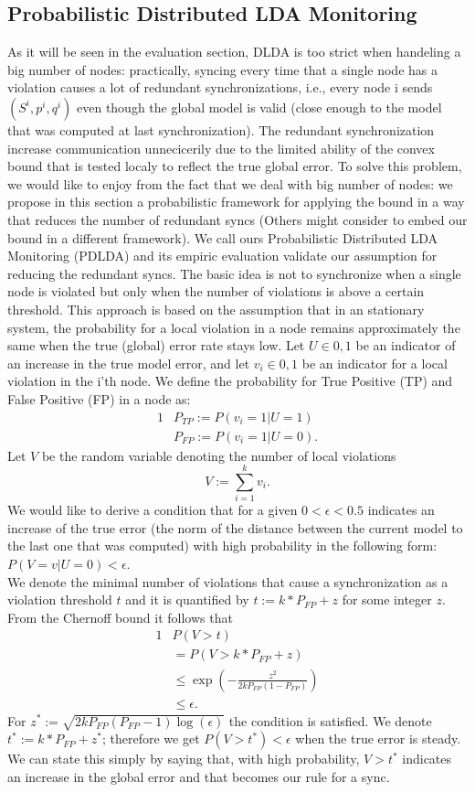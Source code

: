 \documentclass{sig-alternate-05-2015}
\begin{document}
\subsection{Probabilistic Distributed LDA Monitoring}
As it will be seen in the evaluation section, DLDA is too strict when handeling
a big number of nodes: practically, syncing every time that a single node
has a violation causes a lot of redundant synchronizations, i.e., every node i
sends $(S^i,p^i,q^i)$ even though the global model is valid (close enough
to the model that was computed at last synchronization). The redundant
synchronization increase communication unnecicerily due to the limited ability 
of the convex bound that is tested localy to reflect the true global error.
To solve this problem, we would like to enjoy from the fact that we deal with 
big number of nodes: we propose in this section a
probabilistic framework for applying the bound in a way that reduces the number of redundant syncs (Others might consider
to embed our bound in a different framework). 
We call ours Probabilistic Distributed LDA Monitoring (PDLDA) and its
empiric evaluation validate our assumption for reducing the redundant syncs.
The basic idea is not to synchronize when a single node is violated but only 
when the number of violations is above a certain threshold. 
This approach is based on the assumption that in an stationary system, 
the probability for a local violation in a node remains approximately the same
when the true (global) error rate stays low. 
Let $U \in {0,1}$ be an indicator of an increase in the true model error,
and let $v_i \in {0,1}$ be an indicator for a local violation in the
i'th node. We define the probability for True Positive (TP) and False Positive
(FP) in a node as:
\begin{alignat*}{1}
& P_{TP} := P(v_i=1 | U=1) \\
& P_{FP} := P(v_i=1 | U=0).
\end{alignat*}
Let $V$ be the random variable denoting the number of local violations
\begin{equation*}
V := \sum_{i=1}^k v_i.
\end{equation*}
We would like to derive a condition that for a given $0 < \epsilon < 0.5$
indicates an increase of the true error (the norm of
the distance between the current model to the last one that was computed) 
with high probability in the following form:
$P(V=v|U=0) < \epsilon$.
\\We denote the minimal number of violations that cause a synchronization as a violation
threshold $t$ and it is quantified by $t:=k*P_{FP}+z$ for some integer $z$.
From the Chernoff bound it follows that 
\begin{alignat*}{1}
& P(V>t) \\
& = P(V>k*P_{FP}+z) \\
& \leq \exp(-\frac{z^2}{2kP_{FP}(1-P_{FP})}) \\
& \leq \epsilon.
\end{alignat*}
For $z^*:=\sqrt{2kP_{FP}(P_{FP}-1)\log(\epsilon)}$ the condition is satisfied. 
We denote $t^*:=k*P_{FP}+z^*$; therefore we get $P(V > t^*) <
\epsilon$ when the true error is steady.
We can state this simply by saying that, with high probability, $V > t^*$
indicates an increase in the global error and that becomes our rule for a
sync.
\end{document}
